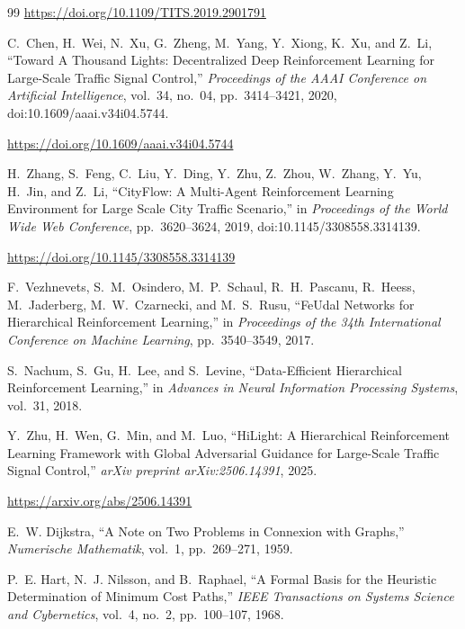\documentclass[3p,times]{elsarticle}
\theoremstyle{plain}
\theoremstyle{definition}
\begin{document}
\begin{thebibliography}{99}
\url{https://doi.org/10.1109/TITS.2019.2901791}

C.~Chen, H.~Wei, N.~Xu, G.~Zheng, M.~Yang, Y.~Xiong, K.~Xu,
and Z.~Li,
``Toward A Thousand Lights: Decentralized Deep Reinforcement
Learning for Large-Scale Traffic Signal Control,''
\textit{Proceedings of the AAAI Conference on Artificial
Intelligence},
vol.~34, no.~04, pp.~3414--3421, 2020,
doi:10.1609/aaai.v34i04.5744.

\url{https://doi.org/10.1609/aaai.v34i04.5744}

H.~Zhang, S.~Feng, C.~Liu, Y.~Ding, Y.~Zhu, Z.~Zhou, W.~Zhang,
Y.~Yu, H.~Jin, and Z.~Li,
``CityFlow: A Multi-Agent Reinforcement Learning Environment for
Large Scale City Traffic Scenario,''
in \textit{Proceedings of the World Wide Web Conference},
pp.~3620--3624, 2019,
doi:10.1145/3308558.3314139.

\url{https://doi.org/10.1145/3308558.3314139}

F.~Vezhnevets, S.~M.~Osindero, M.~P.~Schaul, R.~H.~Pascanu,
R.~Heess, M.~Jaderberg, M.~W.~Czarnecki, and M.~S.~Rusu,
``FeUdal Networks for Hierarchical Reinforcement Learning,''
in \textit{Proceedings of the 34th International Conference on
Machine Learning},
pp.~3540--3549, 2017.

S.~Nachum, S.~Gu, H.~Lee, and S.~Levine,
``Data-Efficient Hierarchical Reinforcement Learning,''
in \textit{Advances in Neural Information Processing Systems},
vol.~31, 2018.

Y.~Zhu, H.~Wen, G.~Min, and M.~Luo,
``HiLight: A Hierarchical Reinforcement Learning Framework with
Global Adversarial Guidance for Large-Scale Traffic Signal
Control,''
\textit{arXiv preprint arXiv:2506.14391}, 2025.

\url{https://arxiv.org/abs/2506.14391}


E.~W. Dijkstra,
``A Note on Two Problems in Connexion with Graphs,''
\textit{Numerische Mathematik},
vol.~1, pp.~269--271, 1959.

P.~E. Hart, N.~J. Nilsson, and B.~Raphael,
``A Formal Basis for the Heuristic Determination of Minimum Cost
Paths,''
\textit{IEEE Transactions on Systems Science and Cybernetics},
vol.~4, no.~2, pp.~100--107, 1968.


\end{thebibliography}
\end{document}
